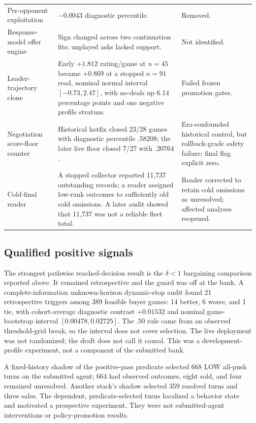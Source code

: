 \begin{table}[h]
\begin{tabularx}{\linewidth}{@{}p{3.0cm}p{4.9cm}Y@{}}
Per-opponent exploitation & $-0.0043$ diagnostic percentile. & Removed. \\
Response-model offer engine & Sign changed across two continuation fits; unplayed asks lacked support. & Not identified. \\
Leader-trajectory clone & Early $+1.812$ rating/game at $n=45$ became $+0.869$ at a stopped $n=91$ read, nominal normal interval $[-0.73,2.47]$, with no-deals up 6.14 percentage points and one negative profile stratum. & Failed frozen promotion gates. \\
Negotiation score-floor counter & Historical hotfix closed 23/28 games with diagnostic percentile $.58208$; the later live floor closed 7/27 with $.20764$. & Era-confounded historical control, but rollback-grade safety failure; final flag explicit zero. \\
Cold-final reader & A stopped collector reported 11,737 outstanding records; a reader assigned low-rank outcomes to sufficiently old cold omissions. A later audit showed that 11,737 was not a reliable fleet total. & Reader corrected to retain cold omissions as unresolved; affected analyses reopened. \\
\bottomrule
\end{tabularx}
\end{table}

\subsection{Qualified positive signals}

The strongest pathwise reached-decision result is the $\delta<1$ bargaining
comparison reported above. It remained retrospective and the guard was off at
the bank. A complete-information unknown-horizon dynamic-stop audit found
21 retrospective triggers among 389 feasible buyer games: 14 better, 6 worse,
and 1 tie, with cohort-average diagnostic contrast $+0.01532$ and nominal
game-bootstrap interval $[0.00478,0.02725]$. The $.50$ rule came from an
observed threshold-grid break, so the interval does not cover selection. The
live deployment was not randomized; the draft does not call it causal. This was
a development-profile experiment, not a component of the submitted bank.

A fixed-history shadow of the positive-pass predicate selected 668 LOW all-push
turns on the submitted agent; 664 had observed outcomes, eight sold, and four remained
unresolved. Another stack's shadow selected 359 resolved turns and three sales.
The dependent, predicate-selected turns localized a behavior state and motivated
a prospective experiment. They were not submitted-agent interventions or policy-promotion
results.

